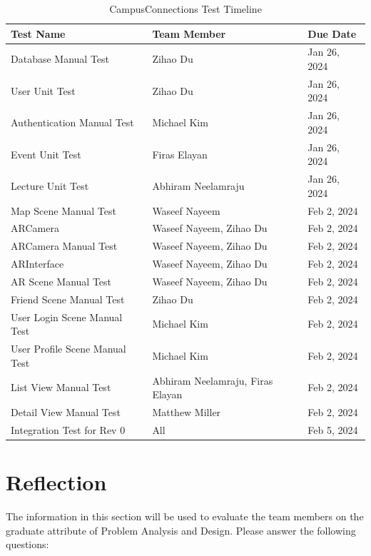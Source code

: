 \documentclass[12pt, titlepage]{article}
\begin{document}
\begin{table}[H]
\centering
\begin{tabular}{p{} p{}  p{}}
\toprule
Test Name & Team Member & Due Date \\
\midrule
Database Manual Test & Zihao Du & Jan 26, 2024\\
User Unit Test & Zihao Du & Jan 26, 2024\\
Authentication Manual Test & Michael Kim & Jan 26, 2024\\
Event Unit Test & Firas Elayan & Jan 26, 2024\\
Lecture Unit Test & Abhiram Neelamraju & Jan 26, 2024\\
Map Scene Manual Test & Waseef Nayeem & Feb 2, 2024\\
ARCamera &Waseef Nayeem, Zihao Du & Feb 2, 2024\\
ARCamera Manual Test &Waseef Nayeem, Zihao Du & Feb 2, 2024\\
ARInterface & Waseef Nayeem, Zihao Du & Feb 2, 2024\\
AR Scene Manual Test & Waseef Nayeem, Zihao Du & Feb 2, 2024\\
Friend Scene Manual Test & Zihao Du & Feb 2, 2024\\
User Login Scene Manual Test & Michael Kim & Feb 2, 2024\\
User Profile Scene Manual Test & Michael Kim & Feb 2, 2024\\
List View Manual Test & Abhiram Neelamraju, Firas Elayan & Feb 2, 2024\\
Detail View Manual Test & Matthew Miller & Feb 2, 2024\\
Integration Test for Rev 0 & All & Feb 5, 2024\\
\bottomrule
\end{tabular}
\caption{CampusConnections Test Timeline}
\end{table}
\newpage{}

\appendix

\section{Reflection}

The information in this section will be used to evaluate the team members on the
graduate attribute of Problem Analysis and Design.  Please answer the following questions:
\end{document}
